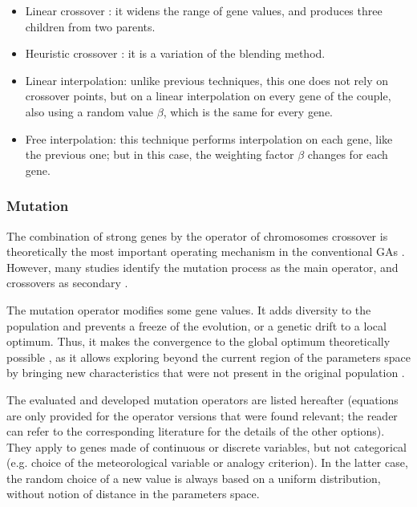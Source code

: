 \documentclass{ametsoc}
\begin{document}
\begin{itemize}
	\item Linear crossover \citep{Wright1991a}: it widens the range of gene values, and produces three children from two parents.
	
	\item Heuristic crossover \citep{Michalewicz1996}: it is a variation of the blending method.
	
	\item Linear interpolation: unlike previous techniques, this one does not rely on crossover points, but on a linear interpolation on every gene of the couple, also using a random value $\beta$, which is the same for every gene.
	
	\item Free interpolation: this technique performs interpolation on each gene, like the previous one; but in this case, the weighting factor $\beta$ changes for each gene.
	
\end{itemize}


\subsubsection{Mutation}
\label{sec:gas:mutation}

The combination of strong genes by the operator of chromosomes crossover is theoretically the most important operating mechanism in the conventional GAs \citep{Holland1992b,Back1993b}. However, many studies identify the mutation process as the main operator, and crossovers as secondary \citep[see][]{Back1992a, Back1996a, Back1996b, Smith1997a, Deb1999, Costa2005a, Costa2007a}.

The mutation operator modifies some gene values. It adds diversity to the population and prevents a freeze of the evolution, or a genetic drift to a local optimum. Thus, it makes the convergence to the global optimum theoretically possible \citep{Beasley1993a}, as it allows exploring beyond the current region of the parameters space by bringing new characteristics that were not present in the original population \citep{Haupt2004}. 

The evaluated and developed mutation operators are listed hereafter (equations are only provided for the operator versions that were found relevant; the reader can refer to the corresponding literature for the details of the other options). They apply to genes made of continuous or discrete variables, but not categorical (e.g. choice of the meteorological variable or analogy criterion). In the latter case, the random choice of a new value is always based on a uniform distribution, without notion of distance in the parameters space.
\end{document}
